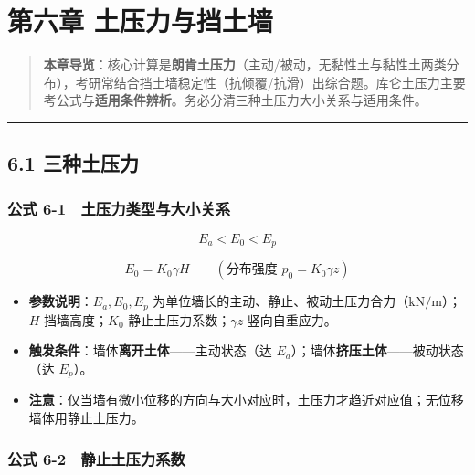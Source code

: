 \documentclass[
]{article}
\author{}
\date{}
\providecommand{\tightlist}{%
  \setlength{\itemsep}{0pt}\setlength{\parskip}{0pt}}
\begin{document}
\section{第六章
土压力与挡土墙}\label{ux7b2cux516dux7ae0-ux571fux538bux529bux4e0eux6321ux571fux5899}

\begin{quote}
\textbf{本章导览}：核心计算是\textbf{朗肯土压力}（主动/被动，无黏性土与黏性土两类分布），考研常结合挡土墙稳定性（抗倾覆/抗滑）出综合题。库仑土压力主要考公式与\textbf{适用条件辨析}。务必分清三种土压力大小关系与适用条件。
\end{quote}

\begin{center}\rule{0.5\linewidth}{0.5pt}\end{center}

\subsection{6.1 三种土压力}\label{ux4e09ux79cdux571fux538bux529b}

\subsubsection{公式
6-1　土压力类型与大小关系}\label{ux516cux5f0f-6-1-ux571fux538bux529bux7c7bux578bux4e0eux5927ux5c0fux5173ux7cfb}

\[E_a<E_0<E_p\]

\[E_0=K_0\gamma H\qquad(\text{分布强度 }p_0=K_0\gamma z)\]

\begin{itemize}
\tightlist
\item
  \textbf{参数说明}：\(E_a,E_0,E_p\)
  为单位墙长的主动、静止、被动土压力合力（\(\mathrm{kN/m}\)）；\(H\)
  挡墙高度；\(K_0\) 静止土压力系数；\(\gamma z\) 竖向自重应力。
\item
  \textbf{触发条件}：墙体\textbf{离开土体}------主动状态（达
  \(E_a\)）；墙体\textbf{挤压土体}------被动状态（达 \(E_p\)）。
\item
  \textbf{注意}：仅当墙有微小位移的方向与大小对应时，土压力才趋近对应值；无位移墙体用静止土压力。
\end{itemize}

\subsubsection{公式
6-2　静止土压力系数}\label{ux516cux5f0f-6-2-ux9759ux6b62ux571fux538bux529bux7cfbux6570}
\end{document}
